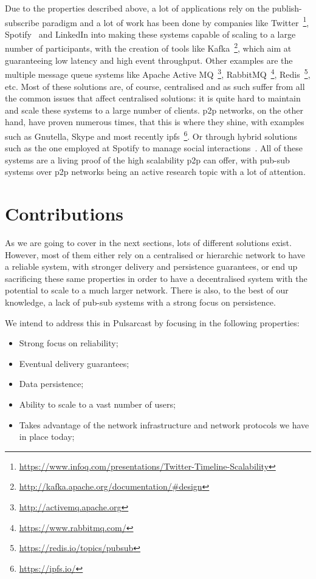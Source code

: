 Due to the properties described above, a lot of applications rely on the
publish-subscribe paradigm and a lot of work has been done by companies like
Twitter~\footnote{\url{https://www.infoq.com/presentations/Twitter-Timeline-Scalability}},
Spotify~\cite{Setty2013} and LinkedIn into making these systems capable of
scaling to a large number of participants, with the creation of tools like
Kafka~\footnote{\url{http://kafka.apache.org/documentation/\#design}}, which
aim at guaranteeing low latency and high event throughput. Other examples are
the multiple message queue systems like Apache Active
MQ~\footnote{\url{http://activemq.apache.org}},
RabbitMQ~\footnote{\url{https://www.rabbitmq.com/}},
Redis~\footnote{\url{https://redis.io/topics/pubsub}}, etc. Most of these
solutions are, of course, centralised and as such suffer from all the common
issues that affect centralised solutions: it is quite hard to maintain and
scale these systems to a large number of clients. \acrfull{p2p} networks, on
the other hand, have proven numerous times, that this is where they shine, with
examples such as Gnutella, Skype and most recently
\acrshort{ipfs}~\footnote{\url{https://ipfs.io/}}. Or through hybrid solutions
such as the one employed at Spotify to manage social
interactions~\cite{Setty2013}. All of these systems are a living proof of the
high scalability \acrshort{p2p} can offer, with pub-sub systems over
\acrshort{p2p} networks being an active research topic with a lot of attention.

\section{Contributions}

As we are going to cover in the next sections, lots of different solutions
exist. However, most of them either rely on a centralised or hierarchic network
to have a reliable system, with stronger delivery and persistence guarantees,
or end up sacrificing these same properties in order to have a decentralised
system with the potential to scale to a much larger network. There is also, to
the best of our knowledge, a lack of pub-sub systems with a strong focus on
persistence.

We intend to address this in Pulsarcast by focusing in the following
properties:

\begin{itemize}
  \item
    Strong focus on reliability;
  \item
    Eventual delivery guarantees;
  \item
    Data persistence;
  \item
    Ability to scale to a vast number of users;
  \item
    Takes advantage of the network infrastructure and network protocols we have in place today;
\end{itemize}

